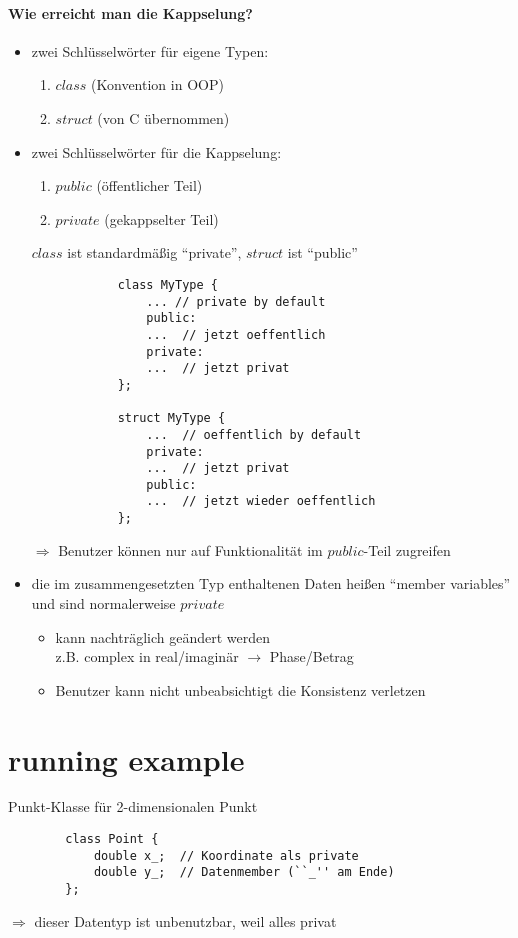 \documentclass{article}
\begin{document}
	\paragraph{Wie erreicht man die Kappselung?}
	\begin{itemize}
		\item zwei Schlüsselwörter für eigene Typen: 
		\begin{enumerate}
			\item $class$ (Konvention in OOP)
			\item $struct$ (von C übernommen)
		\end{enumerate}
		\item zwei Schlüsselwörter für die Kappselung:
		\begin{enumerate}
			\item $public$ (öffentlicher Teil)
			\item $private$ (gekappselter Teil)
		\end{enumerate}
		$class$ ist standardmäßig ``private'', $struct$ ist ``public''
		\begin{lstlisting}
			class MyType {
				... // private by default
				public:
				...  // jetzt oeffentlich
				private:
				...  // jetzt privat
			};

			struct MyType {
				...  // oeffentlich by default
				private:
				...  // jetzt privat
				public:
				...  // jetzt wieder oeffentlich
			};
		\end{lstlisting}
		$\Rightarrow $ Benutzer können nur auf Funktionalität im $public$-Teil zugreifen
		\item die im zusammengesetzten Typ enthaltenen Daten heißen ``member variables'' und sind normalerweise $private$ 
		\begin{itemize}
			\item kann nachträglich geändert werden \\
			z.B. complex in real/imaginär $\rightarrow $ Phase/Betrag
			\item Benutzer kann nicht unbeabsichtigt die Konsistenz verletzen
		\end{itemize}
	\end{itemize}
	\section{running example}
	  Punkt-Klasse für 2-dimensionalen Punkt

	 \begin{lstlisting}
	  	class Point {
	  		double x_;  // Koordinate als private
	  		double y_;  // Datenmember (``_'' am Ende)
	  	};
	 \end{lstlisting}
	  $\Rightarrow $ dieser Datentyp ist unbenutzbar, weil alles privat
\end{document}
